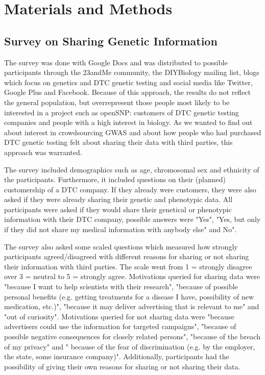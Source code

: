 \documentclass[10pt]{article}
\begin{document}
\section*{Materials and Methods}
\subsection*{Survey on Sharing Genetic Information}
The survey was done with Google Docs and was distributed to possible participants through the 23andMe community, the DIYBiology mailing list, blogs which focus on genetics and DTC genetic testing and social media like Twitter, Google Plus and Facebook. Because of this approach, the results do not reflect the general population, but overrepresent those people most likely to be interested in a project such as openSNP: customers of DTC genetic testing companies and people with a high interest in biology. As we wanted to find out about interest in crowdsourcing GWAS and about how people who had purchased DTC genetic testing felt about sharing their data with third parties, this approach was warranted. 

The survey included demographics such as age, chromosomal sex and ethnicity of the participants. Furthermore, it included questions on their (planned) customership of a DTC company. If they already were customers, they were also asked if they were already sharing their genetic and phenotypic data. All participants were asked if they would share their genetical or phenotypic information with their DTC company, possible answers were "Yes", "Yes, but only if they did not share my medical information with anybody else" and No".

The survey also asked some scaled questions which measured how strongly participants agreed/disagreed with different reasons for sharing or not sharing their information with third parties. The scale went from 1 = strongly disagree over 3 = neutral to  5 = strongly agree. Motivations queried for sharing data were "because I want to help scientists with their research", "because of possible personal benefits (e.g. getting treatments for a disease I have, possibility of new medication, etc.)", "because it may deliver advertising that is relevant to me" and "out of curiosity". Motivations queried for not sharing data were "because advertisers could use the information for targeted campaigns", "because of possible negative consequences for closely related persons", "because of the breach of my privacy" and " because of the fear of discrimination (e.g. by the employer, the state, some insurance company)". Additionally, participants had the possibility of giving their own reasons for sharing or not sharing their data.
\end{document}
